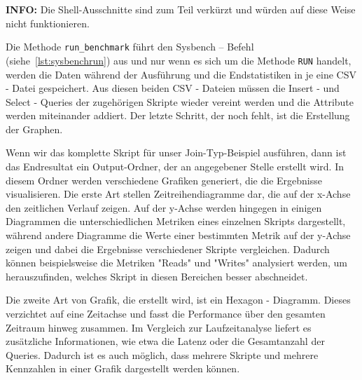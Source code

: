 
\textbf{INFO:} Die Shell-Ausschnitte sind zum Teil verkürzt und würden auf diese Weise nicht funktionieren.

Die Methode \texttt{run\_benchmark} führt den Sysbench – Befehl (siehe~\ref{lst:sysbenchrun}) aus und nur wenn es sich um die Methode \texttt{RUN} handelt, werden die Daten während der Ausführung und die Endstatistiken in je eine CSV - Datei gespeichert.
Aus diesen beiden CSV - Dateien müssen die Insert - und Select - Queries der zugehörigen Skripte wieder vereint werden und die Attribute werden miteinander addiert.
Der letzte Schritt, der noch fehlt, ist die Erstellung der Graphen.

Wenn wir das komplette Skript für unser Join-Typ-Beispiel ausführen, dann ist das Endresultat ein Output-Ordner, der an angegebener Stelle erstellt wird.
In diesem Ordner werden verschiedene Grafiken generiert, die die Ergebnisse visualisieren.
Die erste Art stellen Zeitreihendiagramme dar, die auf der x-Achse den zeitlichen Verlauf zeigen.
Auf der y-Achse werden hingegen in einigen Diagrammen die unterschiedlichen Metriken eines einzelnen Skripts dargestellt, während andere Diagramme die Werte einer bestimmten Metrik auf der y-Achse zeigen und dabei die Ergebnisse verschiedener Skripte vergleichen.
Dadurch können beispielsweise die Metriken "Reads" und "Writes" analysiert werden, um herauszufinden, welches Skript in diesen Bereichen besser abschneidet.

Die zweite Art von Grafik, die erstellt wird, ist ein Hexagon - Diagramm.
Dieses verzichtet auf eine Zeitachse und fasst die Performance über den gesamten Zeitraum hinweg zusammen.
Im Vergleich zur Laufzeitanalyse liefert es zusätzliche Informationen, wie etwa die Latenz oder die Gesamtanzahl der Queries.
Dadurch ist es auch möglich, dass mehrere Skripte und mehrere Kennzahlen in einer Grafik dargestellt werden können.

